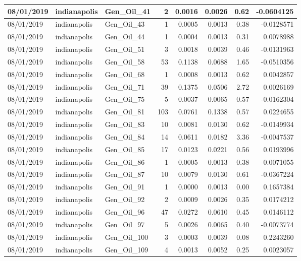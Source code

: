 \documentclass[
  letterpaper,
  DIV=11,
  numbers=noendperiod]{scrartcl}
\begin{document}
\begin{tabular}{l|l|l|r|r|r|r|r}
\hline
08/01/2019 & indianapolis & Gen\_Oil\_41 & 2 & 0.0016 & 0.0026 & 0.62 & -0.0604125\\
\hline
08/01/2019 & indianapolis & Gen\_Oil\_43 & 1 & 0.0005 & 0.0013 & 0.38 & -0.0128571\\
\hline
08/01/2019 & indianapolis & Gen\_Oil\_44 & 1 & 0.0004 & 0.0013 & 0.31 & 0.0078988\\
\hline
08/01/2019 & indianapolis & Gen\_Oil\_51 & 3 & 0.0018 & 0.0039 & 0.46 & -0.0131963\\
\hline
08/01/2019 & indianapolis & Gen\_Oil\_58 & 53 & 0.1138 & 0.0688 & 1.65 & -0.0510356\\
\hline
08/01/2019 & indianapolis & Gen\_Oil\_68 & 1 & 0.0008 & 0.0013 & 0.62 & 0.0042857\\
\hline
08/01/2019 & indianapolis & Gen\_Oil\_71 & 39 & 0.1375 & 0.0506 & 2.72 & 0.0026169\\
\hline
08/01/2019 & indianapolis & Gen\_Oil\_75 & 5 & 0.0037 & 0.0065 & 0.57 & -0.0162304\\
\hline
08/01/2019 & indianapolis & Gen\_Oil\_81 & 103 & 0.0761 & 0.1338 & 0.57 & 0.0224655\\
\hline
08/01/2019 & indianapolis & Gen\_Oil\_83 & 10 & 0.0081 & 0.0130 & 0.62 & -0.0149934\\
\hline
08/01/2019 & indianapolis & Gen\_Oil\_84 & 14 & 0.0611 & 0.0182 & 3.36 & -0.0047537\\
\hline
08/01/2019 & indianapolis & Gen\_Oil\_85 & 17 & 0.0123 & 0.0221 & 0.56 & 0.0193996\\
\hline
08/01/2019 & indianapolis & Gen\_Oil\_86 & 1 & 0.0005 & 0.0013 & 0.38 & -0.0071055\\
\hline
08/01/2019 & indianapolis & Gen\_Oil\_87 & 10 & 0.0079 & 0.0130 & 0.61 & -0.0367224\\
\hline
08/01/2019 & indianapolis & Gen\_Oil\_91 & 1 & 0.0000 & 0.0013 & 0.00 & 0.1657384\\
\hline
08/01/2019 & indianapolis & Gen\_Oil\_92 & 2 & 0.0009 & 0.0026 & 0.35 & 0.0174212\\
\hline
08/01/2019 & indianapolis & Gen\_Oil\_96 & 47 & 0.0272 & 0.0610 & 0.45 & 0.0146112\\
\hline
08/01/2019 & indianapolis & Gen\_Oil\_97 & 5 & 0.0026 & 0.0065 & 0.40 & -0.0073774\\
\hline
08/01/2019 & indianapolis & Gen\_Oil\_100 & 3 & 0.0003 & 0.0039 & 0.08 & 0.2243260\\
\hline
08/01/2019 & indianapolis & Gen\_Oil\_109 & 4 & 0.0013 & 0.0052 & 0.25 & 0.0023057\\

\end{tabular}
\end{document}
